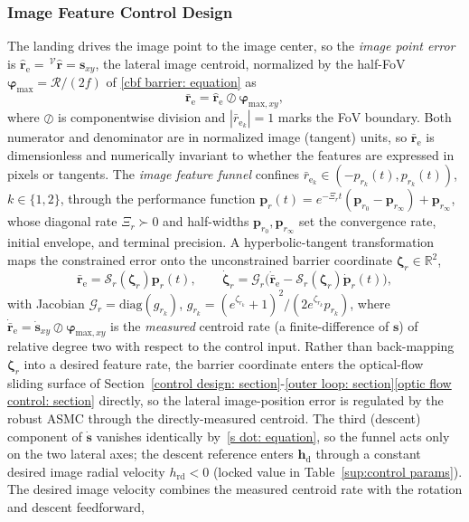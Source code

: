 \documentclass{IEEEtaes}
\begin{document}
\subsubsection{Image Feature Control Design} \label{image point control: section}
The landing drives the image point to the image center, so the \emph{image point error} is $\hat{\boldsymbol{r}}_\text{e}=\,^\mathcal{V}\hat{\boldsymbol{r}}=\boldsymbol{s}_{xy}$, the lateral image centroid, normalized by the half-FoV $\boldsymbol{\varphi}_\text{max}=\mathcal{R}/(2f)$ of \eqref{cbf barrier: equation} as
\begin{equation} \label{normalized error: equation}
    \bar{\boldsymbol{r}}_\text{e} = \hat{\boldsymbol{r}}_\text{e}\oslash\boldsymbol{\varphi}_{\text{max},xy},
\end{equation}
where $\oslash$ is componentwise division and $|\bar{r}_{\text{e}_k}|=1$ marks the FoV boundary. Both numerator and denominator are in normalized image (tangent) units, so $\bar{\boldsymbol{r}}_\text{e}$ is dimensionless and numerically invariant to whether the features are expressed in pixels or tangents. The \emph{image feature funnel} confines $\bar{r}_{\text{e}_k}\in(-p_{r_k}(t),p_{r_k}(t))$, $k\in\{1,2\}$, through the performance function $\boldsymbol{p}_r(t)=e^{-\Xi_r t}(\boldsymbol{p}_{r_0}-\boldsymbol{p}_{r_\infty})+\boldsymbol{p}_{r_\infty}$, whose diagonal rate $\Xi_r\succ 0$ and half-widths $\boldsymbol{p}_{r_0},\boldsymbol{p}_{r_\infty}$ set the convergence rate, initial envelope, and terminal precision. A hyperbolic-tangent transformation maps the constrained error onto the unconstrained barrier coordinate $\boldsymbol{\zeta}_r\in\mathbb{R}^2$,
\begin{equation} \label{image funnel transform: equation}
    \bar{\boldsymbol{r}}_\text{e}=\mathcal{S}_r(\boldsymbol{\zeta}_r)\boldsymbol{p}_r(t),\qquad \dot{\boldsymbol{\zeta}}_r=\mathcal{G}_r\big(\dot{\bar{\boldsymbol{r}}}_\text{e}-\mathcal{S}_r(\boldsymbol{\zeta}_r)\dot{\boldsymbol{p}}_r(t)\big),
\end{equation}
with Jacobian $\mathcal{G}_r=\mathrm{diag}(g_{r_k})$, $g_{r_k}=(e^{\zeta_{r_k}}+1)^2/(2e^{\zeta_{r_k}}p_{r_k})$, where $\dot{\bar{\boldsymbol{r}}}_\text{e}=\dot{\boldsymbol{s}}_{xy}\oslash\boldsymbol{\varphi}_{\text{max},xy}$ is the \emph{measured} centroid rate (a finite-difference of $\boldsymbol{s}$) of relative degree two with respect to the control input. Rather than back-mapping $\boldsymbol{\zeta}_r$ into a desired feature rate, the barrier coordinate enters the optical-flow sliding surface of Section~\ref{control design: section}-\ref{outer loop: section}\ref{optic flow control: section} directly, so the lateral image-position error is regulated by the robust ASMC through the directly-measured centroid. The third (descent) component of $\dot{\boldsymbol{s}}$ vanishes identically by~\eqref{s dot: equation}, so the funnel acts only on the two lateral axes; the descent reference enters $\boldsymbol{h}_\text{d}$ through a constant desired image radial velocity $h_\text{rd}<0$ (locked value in Table~\ref{sup:control params}). The desired image velocity combines the measured centroid rate with the rotation and descent feedforward,
\end{document}
